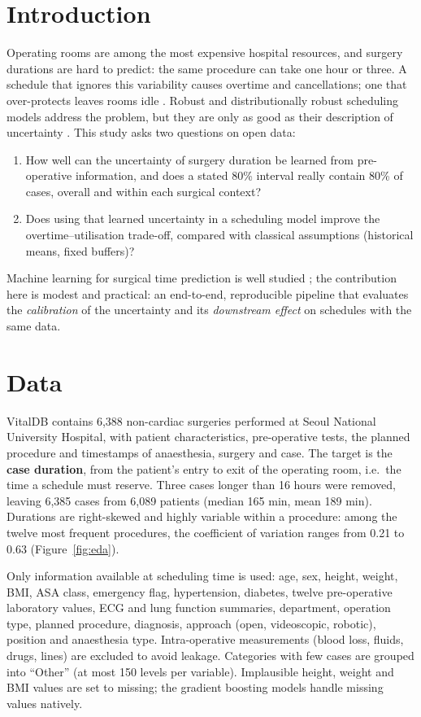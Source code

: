 \documentclass[11pt,a4paper]{article}
\begin{document}
\section{Introduction}
Operating rooms are among the most expensive hospital resources, and surgery durations are hard to predict: the same
procedure can take one hour or three. A schedule that ignores this variability causes overtime and cancellations; one
that over-protects leaves rooms idle \cite{cardoen2010,shehadeh2022}. Robust and distributionally robust scheduling
models address the problem, but they are only as good as their description of uncertainty
\cite{bertsimas2018}. This study asks two questions on open data:
\begin{enumerate}
  \item How well can the uncertainty of surgery duration be learned from pre-operative information, and does a
        stated 80\% interval really contain 80\% of cases, overall and within each surgical context?
  \item Does using that learned uncertainty in a scheduling model improve the overtime--utilisation trade-off,
        compared with classical assumptions (historical means, fixed buffers)?
\end{enumerate}
Machine learning for surgical time prediction is well studied \cite{martinez2021}; the contribution here is modest
and practical: an end-to-end, reproducible pipeline that evaluates the \emph{calibration} of the uncertainty and its
\emph{downstream effect} on schedules with the same data.

\section{Data}
VitalDB \cite{vitaldb} contains 6{,}388 non-cardiac surgeries performed at Seoul National University Hospital, with
patient characteristics, pre-operative tests, the planned procedure and timestamps of anaesthesia, surgery and case.
The target is the \textbf{case duration}, from the patient's entry to exit of the operating room, i.e.\ the time a
schedule must reserve. Three cases longer than 16 hours were removed, leaving 6{,}385 cases from 6{,}089 patients
(median 165 min, mean 189 min). Durations are right-skewed and highly variable within a procedure: among the twelve most
frequent procedures, the coefficient of variation ranges from 0.21 to 0.63 (Figure~\ref{fig:eda}).

Only information available at scheduling time is used: age, sex, height, weight, BMI, ASA class, emergency flag,
hypertension, diabetes, twelve pre-operative laboratory values, ECG and lung function summaries, department, operation
type, planned procedure, diagnosis, approach (open, videoscopic, robotic), position and anaesthesia type. Intra-operative
measurements (blood loss, fluids, drugs, lines) are excluded to avoid leakage. Categories with few cases are grouped
into ``Other'' (at most 150 levels per variable). Implausible height, weight and BMI values are set to missing; the
gradient boosting models handle missing values natively.
\end{document}
